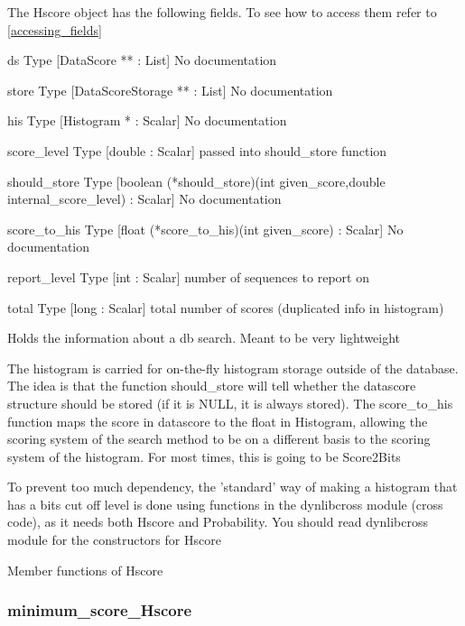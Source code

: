 The Hscore object has the following fields. To see how to access them refer to \ref{accessing_fields}
\begin{description}
\item{ds} Type [DataScore ** : List] No documentation

\item{store} Type [DataScoreStorage ** : List] No documentation

\item{his} Type [Histogram * : Scalar] No documentation

\item{score_level} Type [double : Scalar]  passed into should_store function

\item{should_store} Type [boolean (*should_store)(int given_score,double internal_score_level) : Scalar] No documentation

\item{score_to_his} Type [float (*score_to_his)(int given_score) : Scalar] No documentation

\item{report_level} Type [int : Scalar]  number of sequences to report on

\item{total} Type [long : Scalar]  total number of scores (duplicated info in histogram) 

\end{description}
Holds the information about a db search.
Meant to be very lightweight


The histogram is carried for on-the-fly histogram storage outside
of the database. The idea is that the function should_store will
tell whether the datascore structure should be stored (if it is
NULL, it is always stored). The score_to_his function maps the
score in datascore to the float in Histogram, allowing the scoring
system of the search method to be on a different basis to the 
scoring system of the histogram. For most times, this is going to
be Score2Bits


To prevent too much dependency, the 'standard' way of making a 
histogram that has a bits cut off level is done using functions
in the dynlibcross module (cross code), as it needs both Hscore and
Probability. You should read dynlibcross module for the constructors
for Hscore




Member functions of Hscore

\subsubsection{minimum_score_Hscore}

